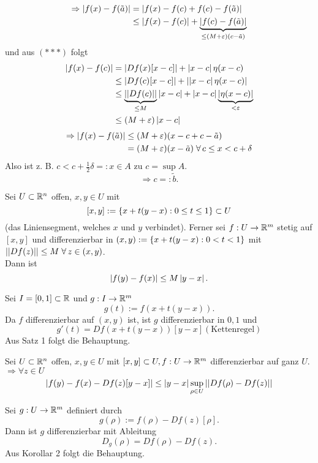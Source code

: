\documentclass[../ana2.tex]{subfiles}
\begin{document}
\begin{bew}
    \begin{align*}
        \Rightarrow \left| f(x) - f(\tilde{a}) \right| 
        &= \left| f(x) - f(c) + f(c) - f(\tilde{a})\right| \\
        &\leq \left|f(x) - f(c)\right| 
        + \underbrace{\left|f(c) - f(\tilde{a})\right|}_{\leq (M+\varepsilon)(c - \tilde{a})}
    \end{align*}
    und aus \( (***) \) folgt 
    \begin{align*} 
        \left| f(x) - f(c) \right| &= \left|Df(x)[x - c]\right| + \left|x - c\right|\eta(x-c) \\
        &\leq \left|Df(c)[x - c]\right| + \left| \left|x-c\right|\eta(x-c) \right|\\
        &\leq \underbrace{\left|\left| Df(c) \right|\right|}_{\leq M} \left|x-c\right|
        + \left|x - c\right| \underbrace{\left| \eta(x-c) \right|}_{<\varepsilon} \\
        &\leq (M+\varepsilon) \left|x-c\right|
    \end{align*}
    \begin{align*}
        \Rightarrow \abs{f(x) - f(\tilde{a})} 
        &\leq (M+\varepsilon)(x - c + c - \tilde{a}) \\
        &= (M+\varepsilon)(x - \tilde{a}) \;\forall c \leq x < c + \delta
    \end{align*}
    Also ist z. B. \( c < c + \frac{1}{2} \delta =: x \in A \)
    \Lightning{} zu \(c = \sup A\).
    \[ \Rightarrow c =: \tilde{b}. \]
\end{bew}
\begin{kor}
    Sei \( U \subset \mathbb{R}^n \) offen, \(x,y \in U\) mit 
    \[ [x,y] := \{x+t(y-x): 0 \leq t \leq 1\} \subset U \]
    (das Liniensegment, welches \(x\) und \(y\) verbindet).
    Ferner sei \( f:U\rightarrow \mathbb{R}^m \) stetig auf \( [x,y] \)
    und differenzierbar in \((x,y) := \{x+t(y-x): 0 < t < 1\} \)
    mit \( \norm{Df(z)} \leq M \;\forall z \in (x,y) \).\\
    Dann ist 
    \[ \left|f(y) - f(x)\right| \leq M \left|y - x\right|. \]
\end{kor}
\begin{bew}
    Sei \( I = [0,1] \subset \mathbb{R} \) und 
    \( g:I\rightarrow \mathbb{R}^m \)
    \[ g(t) := f(x + t(y - x)). \]
    Da \(f\) differenzierbar auf \((x,y)\) ist, ist \(g\)
    differenzierbar in \(0,1\) und
    \[ g'(t) = Df(x+t(y-x))[y-x] (\text{Kettenregel}) \]
    Aus Satz 1 folgt die Behauptung.
\end{bew}
\begin{kor}
    Sei \(U \subset \mathbb{R}^n\) offen, \(x, y \in U\)
    mit \([x,y] \subset U, f:U\rightarrow \mathbb{R}^m\) differenzierbar
    auf ganz \(U\). \(\Rightarrow \forall z \in U\)
    \[\left|f(y)-f(x) - Df(z)[y-x]\right| \leq \left|y-x\right| 
    \underset{\rho \in U}{\sup} \left|\left|Df(\rho)- Df(z)\right|\right| \]
\end{kor}
\begin{bew}
    Sei \(g:U\rightarrow \mathbb{R}^m\) definiert durch 
    \[ g(\rho) := f(\rho) - Df(z)[\rho]. \]
    Dann ist \( g \) differenzierbar mit 
    Ableitung 
    \[ D_g(\rho) = Df(\rho) - Df(z). \]
    Aus Korollar 2 folgt die Behauptung.
\end{bew}
\end{document}
